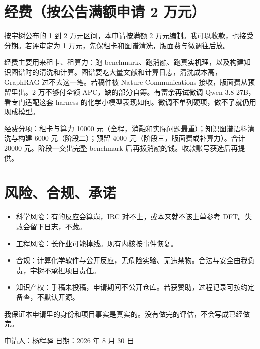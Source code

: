 \documentclass[11pt,a4paper]{article}
\begin{document}
\section{经费（按公告满额申请 2 万元）}
按宇树公布的 1 到 2 万元区间，本申请按满额 2 万元编制。我可以收款，也接受分期。若评审定为 1 万元，先保租卡和图谱清洗，版面费与微调往后放。

经费主要用来租卡、租算力：跑 benchmark、跑消融、跑真实机理，以及构建知识图谱时的清洗和计算。图谱要吃大量文献和计算日志，清洗成本高，GraphRAG 过不去这一笔。若稿件被 Nature Communications 接收，版面费从预留里出。2 万不够付全额 APC，缺的部分自筹。有富余再试微调 Qwen 3.8 27B，看专门适配这套 harness 的化学小模型表现如何。微调不单列硬项，做不了就仍用现成模型。

经费分项：租卡与算力 10000 元（全程，消融和实际问题最重）；知识图谱语料清洗与构建 6000 元（阶段二）；预留 4000 元（阶段三，版面费或补算力）。合计 20000 元。阶段一交出完整 benchmark 后再拨消融的钱。收款账号获选后再提供。

\section{风险、合规、承诺}
\begin{itemize}[leftmargin=2em]
  \item 科学风险：有的反应会算崩，IRC 对不上，或本来就不该上单参考 DFT。失败会留下日志，不藏。
  \item 工程风险：长作业可能掉线。现有内核按事件恢复。
  \item 合规：计算化学软件与公开反应，无危险实验、无违禁物。合法与安全由我负责，宇树不承担项目责任。
  \item 知识产权：手稿未投稿，申请期间不公开仓库。若获赞助，过程记录可按约定备查，不默认开源。
\end{itemize}

我保证本申请里的身份和项目事实是真实的。没有做完的评估，不会写成已经做完。

\vspace{1.6em}
\noindent 申请人：杨程驿 \hfill 日期：2026 年 8 月 30 日
\end{document}
